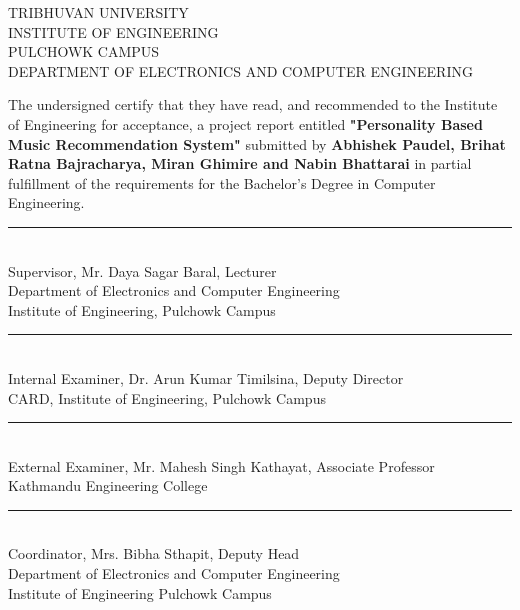 
\newpage
\setcounter{page}{2}

\begin{center}
  TRIBHUVAN UNIVERSITY\\
  INSTITUTE OF ENGINEERING\\
  PULCHOWK CAMPUS\\
  DEPARTMENT OF ELECTRONICS AND COMPUTER ENGINEERING\\
\end{center}
The undersigned certify that they have read, and recommended to the Institute of Engineering for acceptance, a project report entitled \textbf{ "Personality Based Music Recommendation System"} submitted by \textbf{Abhishek Paudel, Brihat Ratna Bajracharya, Miran Ghimire and Nabin Bhattarai} in partial fulfillment of the requirements for the Bachelor's Degree in Computer Engineering.\\[1.1cm]

\begin{minipage}{.80\textwidth}
\rule{1\textwidth}{1pt}\\
Supervisor, Mr. Daya Sagar Baral, Lecturer \\
Department of Electronics and Computer Engineering\\ Institute of Engineering, Pulchowk Campus\\[1cm]
\end{minipage}

\begin{minipage}{.80\textwidth}
\rule{1\textwidth}{1pt}\\
Internal Examiner, Dr. Arun Kumar Timilsina, Deputy Director  \\
CARD, Institute of Engineering, Pulchowk Campus\\[1.1cm]
\end{minipage}

\begin{minipage}{.80\textwidth}
\rule{1\textwidth}{1pt}\\
External Examiner, Mr. Mahesh Singh Kathayat, Associate Professor\\
Kathmandu Engineering College\\[1.1cm]
\end{minipage}

\begin{minipage}{.80\textwidth}
\rule{1\textwidth}{1pt}\\
Coordinator, Mrs. Bibha Sthapit, Deputy Head\\
Department of Electronics and Computer Engineering\\ Institute of Engineering Pulchowk Campus\\[1cm]
\end{minipage}


